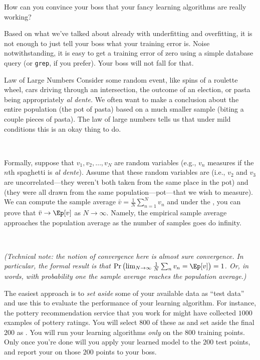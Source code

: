 How can you convince your boss that your fancy learning algorithms are
really working?

Based on what we've talked about already with underfitting and
overfitting, it is not enough to just tell your boss what your
training error is.  Noise notwithstanding, it is easy to get a
training error of zero using a simple database query (or {\tt grep},
if you prefer).  Your boss will not fall for that.

\begin{mathreview}{Law of Large Numbers}
  Consider some random event, like spins of a roulette wheel, cars
  driving through an intersection, the outcome of an election, or
  pasta being appropriately \emph{al dente.} We often want to make a
  conclusion about the entire population (the pot of pasta) based on a
  much smaller sample (biting a couple pieces of pasta). The law of
  large numbers tells us that under mild conditions this is an okay
  thing to do.

  ~

  Formally, suppose that $v_1, v_2, \dots, v_N$ are random variables
  (e.g., $v_n$ measures if the $n$th spaghetti is \emph{al
    dente}). Assume that these random variables are 
  (i.e., $v_2$ and $v_3$ are uncorrelated---they weren't both taken
  from the same place in the pot) and 
  (they were all drawn from the same population---pot---that we wish
  to measure). We can compute the sample average $\bar v = \frac 1 N
  \sum_{n=1}^N v_n$ and under the ,
  you can prove that $\bar v \rightarrow \Ep[v]$ as $N \rightarrow
  \infty$. Namely, the empirical sample average approaches the
  population average as the number of samples goes do infinity.

  ~

  \textit{(Technical note: the notion of convergence here is \emph{almost sure} convergence. In particular, the formal result is that $\textrm{Pr}\left(\lim_{N\rightarrow\infty} \frac 1 N \sum_n v_n = \Ep[v]\right) = 1$. Or, in words, with probability one the sample average reaches the population average.)}
\end{mathreview}

The easiest approach is to \emph{set aside} some of your available
data as ``test data'' and use this to evaluate the performance of your
learning algorithm.  For instance, the pottery recommendation service
that you work for might have collected $1000$ examples of pottery
ratings.  You will select $800$ of these as 
and set aside the final $200$ as .  You will run
your learning algorithms \emph{only} on the $800$ training points.
Only once you're done will you apply your learned model to the $200$
test points, and report your  on those $200$
points to your boss.

